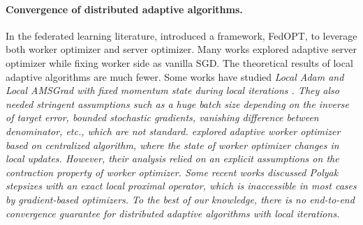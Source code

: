 \documentclass{article} %
\numberwithin{equation}{section}
\begin{document}
\paragraph{Convergence of distributed adaptive algorithms.}

In the federated learning literature, \cite{reddi2020adaptive} introduced a framework, FedOPT, to leverage both worker optimizer and server optimizer.
Many works explored adaptive server optimizer while fixing worker side as vanilla SGD.
The theoretical results of local adaptive algorithms are much fewer.
Some works have studied \em Local \em Adam and \em Local \em AMSGrad with fixed momentum state during local iterations \citep{karimireddy2020mime, chen2020toward, zhao2022communication}.
They also needed stringent assumptions such as a huge batch size depending on the inverse of target error, bounded stochastic gradients, vanishing difference between denominator, etc., which are not standard. 
\citet{wang2021local} explored adaptive worker optimizer based on centralized algorithm, where the state of worker optimizer changes in local updates.
However, their analysis relied on an explicit assumptions \citep[Assumption 1]{wang2021local} on the contraction property of worker optimizer.
Some recent works \citep{li2024power,anyszka2024tighter} discussed Polyak stepsizes with an exact local proximal operator, which is inaccessible in most cases by gradient-based  optimizers.
To the best of our knowledge, there is no end-to-end convergence guarantee for distributed adaptive algorithms with local iterations. 



\end{document}

